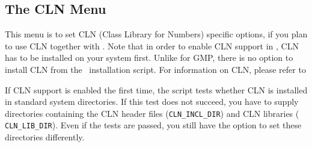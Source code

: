 
\subsection{The CLN Menu}\label{sec:cln-menu}

This menu is to set CLN (Class Library for Numbers) specific
options, if you plan to use CLN together with \cgal . Note that in
order to enable CLN support in \cgal, CLN has to be installed on your
system first.  Unlike for GMP, there is no option to install CLN from
the \cgal\ installation script. For information on CLN, please refer
to
\begin{quote}
  \clnpage
\end{quote}

If CLN support is enabled the first time, the script tests whether CLN
is installed in standard system directories. If this test does not
succeed, you have to supply directories containing the CLN header
files (\texttt{CLN\_INCL\_DIR}) and CLN libraries ({\tt
  CLN\_LIB\_DIR}). Even if the tests are passed, you still have the
option to set these directories differently.\bigskip

